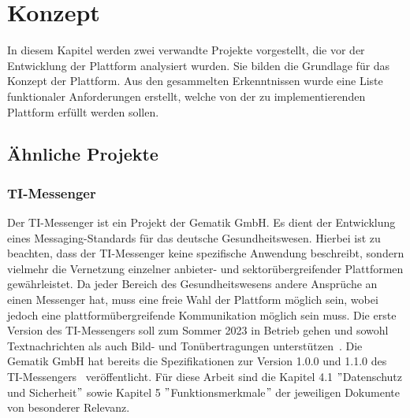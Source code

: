     \chapter{Konzept}\label{ch:konzept}
    In diesem Kapitel werden zwei verwandte Projekte vorgestellt, die vor der Entwicklung der Plattform analysiert wurden.
    Sie bilden die Grundlage für das Konzept der Plattform.
    Aus den gesammelten Erkenntnissen wurde eine Liste funktionaler Anforderungen erstellt, welche von der zu implementierenden Plattform erfüllt werden sollen.

    \section{Ähnliche Projekte}\label{sec:analyse-ahnlicher-projekte}

    \subsection{TI-Messenger}\label{subsec:ti-messenger}
    Der TI-Messenger ist ein Projekt der Gematik GmbH.
    Es dient der Entwicklung eines Messaging-Standards für das deutsche Gesundheitswesen.
    Hierbei ist zu beachten, dass der TI-Messenger keine spezifische Anwendung beschreibt, sondern vielmehr die Vernetzung einzelner anbieter- und sektorübergreifender Plattformen gewährleistet.
    Da jeder Bereich des Gesundheitswesens andere Ansprüche an einen Messenger hat, muss eine freie Wahl der Plattform möglich sein, wobei jedoch eine plattformübergreifende Kommunikation möglich sein muss.
    Die erste Version des TI-Messengers soll zum Sommer 2023 in Betrieb gehen und sowohl Textnachrichten als auch Bild- und Tonübertragungen unterstützen~\cite{timessenger,timessenger2}.
    Die Gematik GmbH hat bereits die Spezifikationen zur Version 1.0.0 und 1.1.0 des TI-Messengers~\cite{timessenger3} veröffentlicht.
    Für diese Arbeit sind die Kapitel 4.1 \("\)Datenschutz und Sicherheit\("\) sowie Kapitel 5 \("\)Funktionsmerkmale\("\) der jeweiligen Dokumente von besonderer Relevanz.

